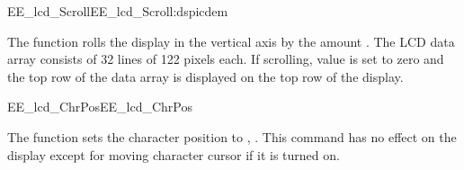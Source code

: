 \begin{function_nopb2}{EE\_lcd\_Scroll}{EE_lcd_Scroll:dspicdem}
  
  \begin{fundescription}
    The function rolls the display in the vertical axis by the
    amount . The LCD data array consists of 32 lines of
    122 pixels each. If scrolling, value  is set to zero
    and the top row of the data array is displayed on the top row of
    the display.
  \end{fundescription}
  
  \begin{funparameters}
  \end{funparameters}
  
  
\end{function_nopb2}

\begin{function_nopb2}{EE\_lcd\_ChrPos}{EE_lcd_ChrPos}
  
  \begin{fundescription}
    The function sets the character position to ,
    . This command has no effect on the display except for
    moving character cursor if it is turned on.
  \end{fundescription}
  
  \begin{funparameters}
  \end{funparameters}
  
  
\end{function_nopb2}

